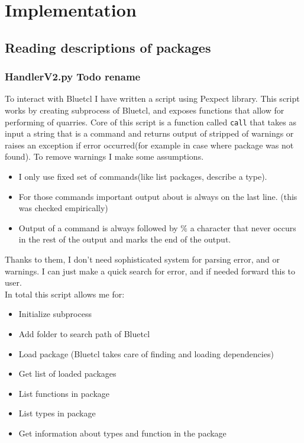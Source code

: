 \documentclass[14pt]{report}
\begin{document}
\chapter{Implementation}
\section{Reading descriptions of packages}
\subsection{HandlerV2.py Todo rename}
To interact with Bluetcl I have written a script using Pexpect library. This script works by creating subprocess of Bluetcl, and exposes functions that allow for performing of quarries. Core of this script is a function called \verb!call! that takes as input a string that is a command and returns output of stripped of warnings or raises an exception if error occurred(for example in case where package was not found). To remove warnings I make some assumptions.
\begin{itemize}
    \item I only use fixed set of commands(like list packages, describe a type).
    \item For those commands important output about is always on the last line. (this was checked empirically)
    \item Output of a command is always followed by $\%$ a character that never occurs in the rest of the output and marks the end of the output.
\end{itemize}
Thanks to them, I don't need sophisticated system for parsing error, and or warnings. I can just make a quick search for error, and if needed forward this to user.
\\ 
In total this script allows me for:
\begin{itemize}
    \item Initialize subprocess
    \item Add folder to search path of Bluetcl
    \item Load package (Bluetcl takes care of finding and loading dependencies)
    \item Get list of loaded packages
    \item List functions in package
    \item List types in package
    \item Get information about types and function in the package
\end{itemize}
\end{document}
